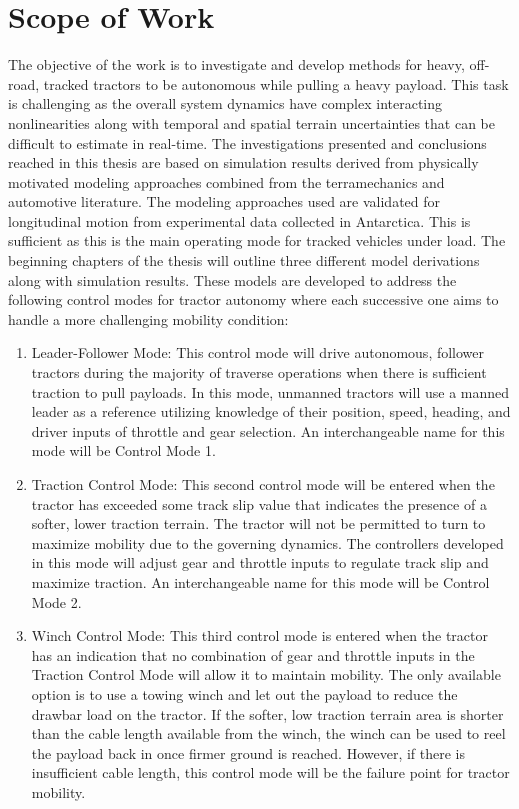 \section{Scope of Work}
The objective of the work is to investigate and develop methods for heavy, off-road, tracked tractors to be autonomous while pulling a heavy payload. This task is challenging as the overall system dynamics have complex interacting nonlinearities along with temporal and spatial terrain uncertainties that can be difficult to estimate in real-time. The investigations presented and conclusions reached in this thesis are based on simulation results derived from physically motivated modeling approaches combined from the terramechanics and automotive literature. The modeling approaches used are validated for longitudinal motion from experimental data collected in Antarctica. This is sufficient as this is the main operating mode for tracked vehicles under load. The beginning chapters of the thesis will outline three different model derivations along with simulation results. These models are developed to address the following control modes for tractor autonomy where each successive one aims to handle a more challenging mobility condition:
\begin{enumerate}
    \item Leader-Follower Mode: This control mode will drive autonomous, follower tractors during the majority of traverse operations when there is sufficient traction to pull payloads. In this mode, unmanned tractors will use a manned leader as a reference utilizing knowledge of their position, speed, heading, and driver inputs of throttle and gear selection. An interchangeable name for this mode will be Control Mode 1.
    \item Traction Control Mode: This second control mode will be entered when the tractor has exceeded some track slip value that indicates the presence of a softer, lower traction terrain. The tractor will not be permitted to turn to maximize mobility due to the governing dynamics. The controllers developed in this mode will adjust gear and throttle inputs to regulate track slip and maximize traction. An interchangeable name for this mode will be Control Mode 2.
    \item Winch Control Mode: This third control mode is entered when the tractor has an indication that no combination of gear and throttle inputs in the Traction Control Mode will allow it to maintain mobility. The only available option is to use a towing winch and let out the payload to reduce the drawbar load on the tractor. If the softer, low traction terrain area is shorter than the cable length available from the winch, the winch can be used to reel the payload back in once firmer ground is reached. However, if there is insufficient cable length, this control mode will be the failure point for tractor mobility.
\end{enumerate}


